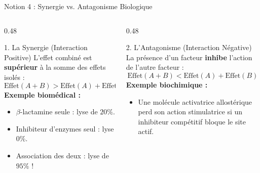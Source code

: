 \documentclass[aspectratio=169,10pt]{beamer}
\begin{document}
\begin{frame}{Notion 4 : Synergie vs. Antagonisme Biologique}
  \begin{columns}[onlytextwidth, T]
    \begin{column}{0.48\linewidth}
      \begin{biobox}{1. La Synergie (Interaction Positive)}
        \small
        L'effet combiné est \textbf{supérieur} à la somme des effets isolés :
        \begin{equation*}
          \text{Effet}(A + B) > \text{Effet}(A) + \text{Effet}(B)
        \end{equation*}
        \textbf{Exemple biomédical :}
        \begin{itemize}
          \item $\beta$-lactamine seule : lyse de $20\%$.
          \item Inhibiteur d'enzymes seul : lyse $0\%$.
          \item Association des deux : lyse de $95\%$ !
        \end{itemize}
      \end{biobox}
    \end{column}
    \begin{column}{0.48\linewidth}
      \begin{warnbox}{2. L'Antagonisme (Interaction Négative)}
        \small
        La présence d'un facteur \textbf{inhibe} l'action de l'autre facteur :
        \begin{equation*}
          \text{Effet}(A + B) < \text{Effet}(A) + \text{Effet}(B)
        \end{equation*}
        \textbf{Exemple biochimique :}
        \begin{itemize}
          \item Une molécule activatrice allostérique perd son action stimulatrice si un inhibiteur compétitif bloque le site actif.
        \end{itemize}
      \end{warnbox}
    \end{column}
  \end{columns}
\end{frame}
\end{document}
